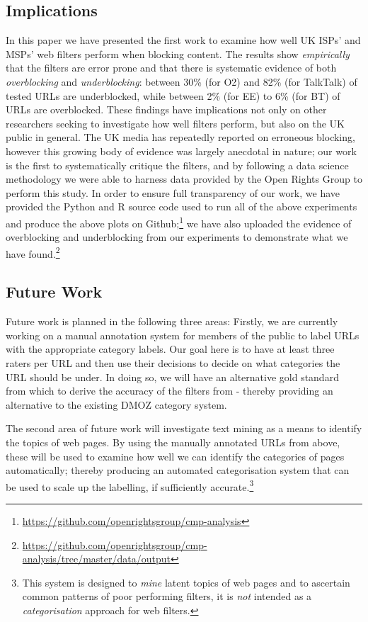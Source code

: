\documentclass{bmcart}
\begin{document}
\subsection*{Implications}
In this paper we have presented the first work to examine how well UK ISPs' and MSPs' web filters perform when blocking content.
The results show \textit{empirically} that the filters are error prone and that there is systematic evidence of both \textit{overblocking} and \textit{underblocking}: between 30\% (for O2) and 82\% (for TalkTalk) of tested URLs are underblocked, while between 2\% (for EE) to 6\% (for BT) of URLs are overblocked.
These findings have implications not only on other researchers seeking to investigate how well filters perform, but also on the UK public in general.
The UK media has repeatedly reported on erroneous blocking, however this growing body of evidence was largely anecdotal in nature; our work is the first to systematically critique the filters, and by following a data science methodology we were able to harness data provided by the Open Rights Group to perform this study.
In order to ensure full transparency of our work, we have provided the Python and R source code used to run all of the above experiments and produce the above plots on Github;\footnote{\url{https://github.com/openrightsgroup/cmp-analysis}} we have also uploaded the evidence of overblocking and underblocking from our experiments to demonstrate what we have found.\footnote{\url{https://github.com/openrightsgroup/cmp-analysis/tree/master/data/output}}

\subsection*{Future Work}
Future work is planned in the following three areas:
Firstly, we are currently working on a manual annotation system for members of the public to label URLs with the appropriate category labels.
Our goal here is to have at least three raters per URL and then use their decisions to decide on what categories the URL should be under.
In doing so, we will have an alternative gold standard from which to derive the accuracy of the filters from - thereby providing an alternative to the existing DMOZ category system.

The second area of future work will investigate text mining as a means to identify the topics of web pages.
By using the manually annotated URLs from above, these will be used to examine how well we can identify the categories of pages automatically; thereby producing an automated categorisation system that can be used to scale up the labelling, if sufficiently accurate.\footnote{This system is designed to \textit{mine} latent topics of web pages and to ascertain common patterns of poor performing filters, it is \emph{not} intended as a \emph{categorisation} approach for web filters.}
\end{document}
